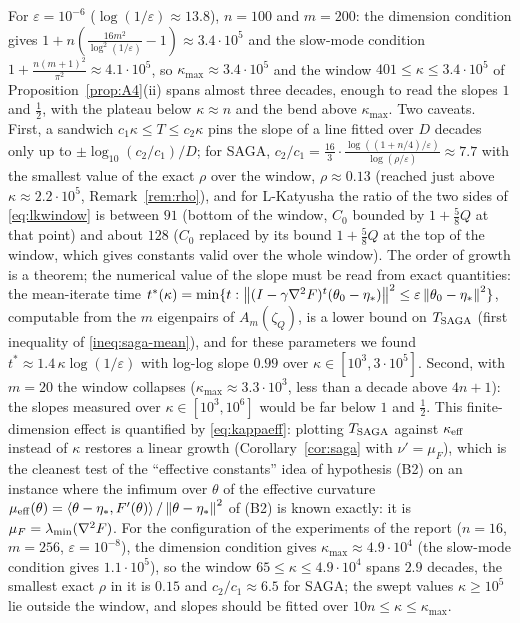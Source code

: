 \begin{remark}
\label{rem:plot}
For $\varepsilon=10^{-6}$ ($\log(1/\varepsilon)\approx13.8$), $n=100$ and $m=200$: the dimension condition gives $1+n(\frac{16m^2}{\log^2(1/\varepsilon)}-1)\approx3.4\cdot10^5$ and the slow-mode condition $1+\frac{n(m+1)^2}{\pi^2}\approx4.1\cdot10^5$, so $\kappa_{\max}\approx3.4\cdot10^5$ and the window $401\le\kappa\le3.4\cdot10^5$ of Proposition~\ref{prop:A4}(ii) spans almost three decades, enough to read the slopes $1$ and $\frac12$, with the plateau below $\kappa\approx n$ and the bend above $\kappa_{\max}$. Two caveats. First, a sandwich $c_1\kappa\le T\le c_2\kappa$ pins the slope of a line fitted over $D$ decades only up to $\pm\log_{10}(c_2/c_1)/D$; for SAGA, $c_2/c_1=\frac{16}3\cdot\frac{\log((1+n/4)/\varepsilon)}{\log(\rho/\varepsilon)}\approx7.7$ with the smallest value of the exact $\rho$ over the window, $\rho\approx0.13$ (reached just above $\kappa\approx2.2\cdot10^5$, Remark~\ref{rem:rho}), and for L-Katyusha the ratio of the two sides of \eqref{eq:lkwindow} is between $91$ (bottom of the window, $C_0$ bounded by $1+\frac58Q$ at that point) and about $128$ ($C_0$ replaced by its bound $1+\frac58Q$ at the top of the window, which gives constants valid over the whole window). The order of growth is a theorem; the numerical value of the slope must be read from exact quantities: the mean-iterate time $t^\ast(\kappa)=\min\{t:\left\|(I-\gamma\nabla^2F)^t(\theta_0-\eta_\ast)\right\|^2\le\varepsilon\left\|\theta_0-\eta_\ast\right\|^2\}$, computable from the $m$ eigenpairs of $A_m(\zeta_Q)$, is a lower bound on $T_{\rm SAGA}$ (first inequality of \eqref{ineq:saga-mean}), and for these parameters we found $t^\ast\approx1.4\,\kappa\log(1/\varepsilon)$ with log-log slope $0.99$ over $\kappa\in[10^3,3\cdot10^5]$. Second, with $m=20$ the window collapses ($\kappa_{\max}\approx3.3\cdot10^3$, less than a decade above $4n+1$): the slopes measured over $\kappa\in[10^3,10^6]$ would be far below $1$ and $\frac12$. This finite-dimension effect is quantified by \eqref{eq:kappaeff}: plotting $T_{\rm SAGA}$ against $\kappa_{\rm eff}$ instead of $\kappa$ restores a linear growth (Corollary~\ref{cor:saga} with $\nu'=\mu_F$), which is the cleanest test of the ``effective constants'' idea of hypothesis (B2) on an instance where the infimum over $\theta$ of the effective curvature $\mu_{\mathrm{eff}}(\theta)=\left\langle \theta-\eta_\ast, F'(\theta) \right\rangle/\left\|\theta-\eta_\ast\right\|^2$ of (B2) is known exactly: it is $\mu_F=\lambda_{\min}(\nabla^2F)$. For the configuration of the experiments of the report ($n=16$, $m=256$, $\varepsilon=10^{-8}$), the dimension condition gives $\kappa_{\max}\approx4.9\cdot10^4$ (the slow-mode condition gives $1.1\cdot10^5$), so the window $65\le\kappa\le4.9\cdot10^4$ spans $2.9$ decades, the smallest exact $\rho$ in it is $0.15$ and $c_2/c_1\approx6.5$ for SAGA; the swept values $\kappa\ge10^5$ lie outside the window, and slopes should be fitted over $10n\le\kappa\le\kappa_{\max}$.
\end{remark}

